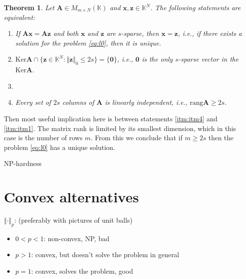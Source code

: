 \documentclass[11pt]{article}
\newtheorem{theorem}[definition]{Theorem}
\newcommand{\norm}[1]{\left\Vert#1\right\Vert}
\newcommand{\A}{\mathbf{A}}
\newcommand{\x}{\mathbf{x}}
\begin{document}
\begin{theorem}
    Let $\mathbf{A} \in M_{m \times N}(\mathbb{K})$  and $\mathbf{x}, \mathbf{z} \in \mathbb{K}^N$.
    The following statements are equivalent:

    \begin{enumerate}[label=(\roman*)]
        \item \label{itm:itm1} If $\mathbf{Ax = Az}$ and both $\x$ and $\mathbf{z}$ are $s$-sparse, then $\mathbf{x = z}$, i.e.,
        if there exists a solution for the problem \ref{eq:l0}, then it is unique.
        \item $\mathrm{Ker} \A \cap \{ \mathbf{z} \in \mathbb{K}^N \colon \norm{\mathbf{z}}_0 \leq 2s \} = \{ \mathbf{0} \}$,
        i.e., $\mathbf{0}$ is the only $s$-sparse vector in the $\mathrm{Ker} \A$.
        \item
        \item \label{itm:itm4} Every set of $2s$ columns of $\A$ is linearly independent, i.e., $\mathrm{rang} \A \geq 2s$.
    \end{enumerate}
\end{theorem}

Then most useful implication here is between statements \ref{itm:itm4} and \ref{itm:itm1}.
The matrix rank is limited by its smallest dimension, which in this case is the number of rows $m$.
From this we conclude that if $m \geq 2s$ then the problem \ref{eq:l0} has a unique solution.

NP-hardness


\section{Convex alternatives}
$\norm{\cdot}_p$: (preferably with pictures of unit balls)
\begin{itemize}
    \item $0 < p < 1$: non-convex, NP, bad
    \item $p > 1$: convex, but doesn't solve the problem in general
    \item $p = 1$: convex, solves the problem, good
\end{itemize}
\end{document}
